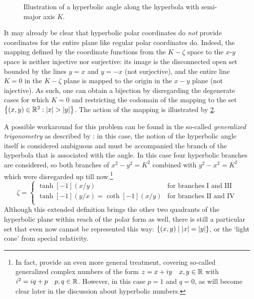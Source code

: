 \begin{figure}[ht!]
    \centering
    
    \caption{Illustration of a hyperbolic angle along the hyperbola with semi-major axis \(K\).}
    \label{fig:hyperbolic_angle}
\end{figure}
It may already be clear that hyperbolic polar coordinates do \emph{not} provide coordinates for the entire plane like regular polar coordinates do. Indeed, the mapping defined by the coordinate functions from the \(K-\zeta\) space to the \(x\)-\(y\) space is neither injective nor surjective: its image is the disconnected open set bounded by the lines \(y = x\) and \(y = -x\) (not surjective), and the entire line \(K = 0\) in the \(K-\zeta\) plane is mapped to the origin in the \(x-y\) plane (not injective). As such, one can obtain a bijection by disregarding the degenerate cases for which \(K = 0\) and restricting the codomain of the mapping to the set \(\qty{(x, y) \in \real^2: \abs{x} > \abs{y}}\). The action of the mapping is illustrated by \cref{fig:polar_coords}.
\begin{figure}[ht]
    \centering
    
    \caption{}
    \label{fig:polar_coords}
\end{figure}

A possible workaround for this problem can be found in the so-called \emph{generalized trigonometry} as described by \citet{Harkin2004}: in this case, the notion of the hyperbolic angle itself is considered ambiguous and must be accompanied the branch of the hyperbola that is associated with the angle. In this case four hyperbolic branches are considered, so both branches of \(x^2 - y^2 = K^2\) combined with \(y^2 - x^2 = K^2\) which were disregarded up till now.\footnote{In fact, \citeauthor{Harkin2004} provide an even more general treatment, covering so-called generalized complex numbers of the form \(z = x + iy\quad x, y \in \mathbb{R}\) with \(i^2 = iq + p\quad p, q \in \mathbb{R}\). However, in this case \(p = 1\) and \(q = 0\), as will become clear later in the discussion about hyperbolic numbers.}
\begin{equation}
    \zeta = 
    \begin{cases}
        \tanh[-1](x/y) & \text{for branches I and III}\\
        \tanh[-1](y/x) = \coth[-1](x/y) & \text{for branches II and IV}\\
    \end{cases}
\end{equation}
Although this extended definition brings the other two quadrants of the hyperbolic plane within reach of the polar form as well, there is still a particular set that even now cannot be represented this way: \(\qty{(x, y)\mid \abs{x} = \abs{y}}\), or the `light cone' from special relativity.

